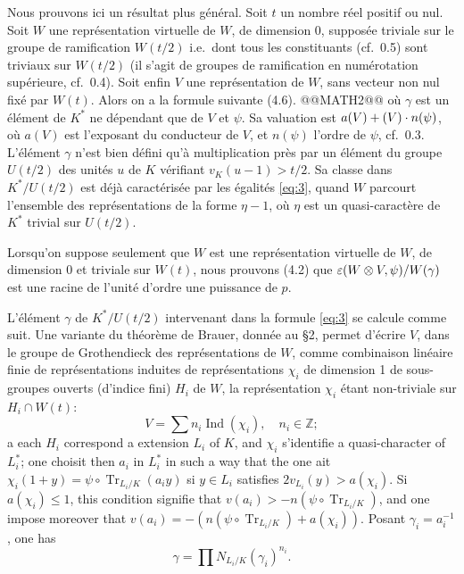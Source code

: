 \documentclass[12pt,a4paper]{article}
\theoremstyle{plain}
\theoremstyle{definition}
\theoremstyle{remark}
\DeclareMathOperator{\Ind}{Ind}
\DeclareMathOperator{\Tr}{Tr}
\let\dim\relax\let\det\relax
\providecommand{\Tr}{\operatorname{Tr}}
\begin{document}
Nous prouvons ici un r\'esultat plus g\'en\'eral. Soit $t$ un nombre r\'eel positif ou nul. Soit $W$ une repr\'esentation virtuelle de $W$, de dimension 0, suppos\'ee triviale sur le groupe de ramification $W(t/2)$ i.e.~dont tous les constituants (cf.~0.5) sont triviaux sur $W(t/2)$ (il s'agit de groupes de ramification en num\'erotation sup\'erieure, cf.~0.4). Soit enfin $V$ une repr\'esentation de $W$, sans vecteur non nul fix\'e par $W(t)$. Alors on a la formule suivante (4.6).
@@MATH2@@
o\`u $\gamma$ est un \'el\'ement de $K^*$ ne d\'ependant que de $V$ et $\psi$. Sa valuation est $a(V) + (\dim V) \cdot n(\psi)$, o\`u $a(V)$ est l'exposant du conducteur de $V$, et $n(\psi)$ l'ordre de $\psi$, cf.~0.3. L'\'el\'ement $\gamma$ n'est bien d\'efini qu'\`a multiplication pr\`es par un \'el\'ement du groupe $U(t/2)$ des unit\'es $u$ de $K$ v\'erifiant $v_K(u-1) > t/2$. Sa classe dans $K^*/U(t/2)$ est d\'ej\`a caract\'eris\'ee par les \'egalit\'es \eqref{eq:3}, quand $W$ parcourt l'ensemble des repr\'esentations de la forme $\eta - 1$, o\`u $\eta$ est un quasi-caract\`ere de $K^*$ trivial sur $U(t/2)$.

Lorsqu'on suppose seulement que $W$ est une repr\'esentation virtuelle de $W$, de dimension 0 et triviale sur $W(t)$, nous prouvons (4.2) que $\varepsilon(W \otimes V, \psi)/\det W(\gamma)$ est une racine de l'unit\'e d'ordre une puissance de $p$.

L'\'el\'ement $\gamma$ de $K^*/U(t/2)$ intervenant dans la formule \eqref{eq:3} se calcule comme suit. Une variante du th\'eor\`eme de Brauer, donn\'ee au \S 2, permet d'\'ecrire $V$, dans le groupe de Grothendieck des repr\'esentations de $W$, comme combinaison lin\'eaire finie de repr\'esentations induites de repr\'esentations $\chi_i$ de dimension 1 de sous-groupes ouverts (d'indice fini) $H_i$ de $W$, la repr\'esentation $\chi_i$ \'etant non-triviale sur $H_i \cap W(t)$:
\[
V = \sum n_i \Ind(\chi_i), \quad n_i \in \mathbb{Z};
\]
a each $H_i$ correspond a extension $L_i$ of $K$, and $\chi_i$ s'identifie a quasi-character of $L_i^*$; one choisit then $a_i$ in $L_i^*$ in such a way that the one ait $\chi_i(1+y) = \psi \circ \Tr_{L_i/K}(a_i y)$ si $y \in L_i$ satisfies $2v_{L_i}(y) > a(\chi_i)$. Si $a(\chi_i) \leq 1$, this condition signifie that $v(a_i) > -n(\psi \circ \Tr_{L_i/K})$, and one impose moreover that $v(a_i) = -(n(\psi \circ \Tr_{L_i/K}) + a(\chi_i))$. Posant $\gamma_i = a_i^{-1}$, one has
\begin{equation}\label{eq:4}
\gamma = \prod N_{L_i/K}(\gamma_i)^{n_i}.
\end{equation}
\end{document}
